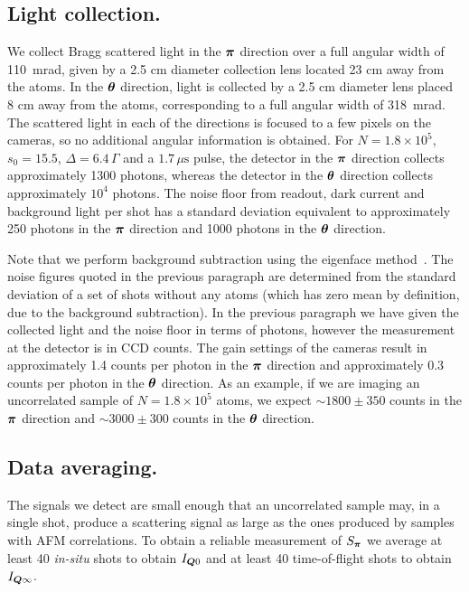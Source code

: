 \subsection{Light collection.} We collect Bragg scattered light in the
$\bm{\pi}$ direction over a full angular width of  110~mrad,  given by a 2.5 cm
diameter collection lens located 23 cm away from the atoms.    In the
$\bm{\theta}$ direction, light is collected by a 2.5 cm diameter  lens placed 8
cm away from the atoms, corresponding to a full angular width of 318~mrad.  The
scattered light in each of the directions is focused to a few pixels on the
cameras, so no additional angular information is obtained.  For
$N=1.8\times10^{5}$, $s_{0}=15.5$, $\Delta=6.4\,\Gamma$ and a
$1.7\,\mu\text{s}$ pulse, the detector in the $\bm{\pi}$ direction collects
approximately 1300 photons, whereas the detector in the $\bm{\theta}$ direction
collects approximately $10^4$ photons.   The noise floor from readout, dark
current and background light per shot has a standard deviation equivalent to
approximately 250 photons in the $\bm{\pi}$ direction and 1000 photons in the
$\bm{\theta}$ direction.

Note that we perform background subtraction using the eigenface
method~\cite{PhysRevA.82.061606}.  The noise figures quoted in the previous
paragraph are determined from the standard deviation of a set of shots without
any atoms (which has zero mean by definition, due to the background
subtraction).  In the previous paragraph we have given the collected light and
the noise floor in terms of photons, however the measurement at the detector is
in CCD counts.  The gain settings of the cameras result in approximately 1.4
counts per photon in the $\bm{\pi}$ direction and approximately 0.3 counts per
photon in the $\bm{\theta}$ direction.  As an example, if we are imaging an
uncorrelated sample of $N=1.8\times 10^{5}$ atoms, we expect $\sim1800\pm350$
counts in the $\bm{\pi}$ direction and $\sim3000\pm300$ counts in the
$\bm{\theta}$ direction.

\subsection{Data averaging.} The signals we detect are small enough that an
uncorrelated sample may, in a single shot, produce a scattering signal as
large as the ones produced by samples with AFM correlations.  To obtain a
reliable measurement of $S_{\bm{\pi}}$ we average at least 40
\textit{in-situ} shots to obtain $I_{\bm{Q}0}$ and at least 40
time-of-flight shots to obtain $I_{\bm{Q}\infty}$.
 
